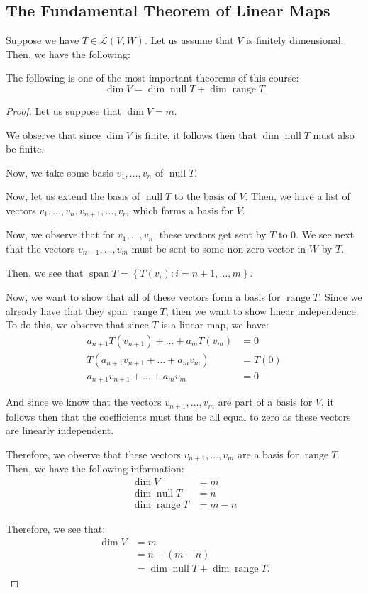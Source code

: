 \documentclass[openany]{book}
\DeclareMathOperator*{\vspan}{span}
\DeclareMathOperator*{\vnull}{null}
\DeclareMathOperator*{\vrange}{range}
\begin{document}
\subsection{The Fundamental Theorem of Linear Maps}
Suppose we have $T \in \mathcal L(V,W)$.  Let us assume that $V$ is finitely dimensional. Then, we have the following:
\begin{thm}
	The following is one of the most important theorems of this course:
	\begin{equation*}
				\dim V = \dim \vnull T + \dim \vrange T 
	\end{equation*}
\end{thm}
\begin{proof}
	Let us suppose that $\dim V = m$.
	
	We observe that since $\dim V$ is finite, it follows then that $\dim \vnull T$ must also be finite.
	
	Now, we take some basis $v_{1}, \ldots, v_{n}$ of $\vnull T$.
	
	Now, let us extend the basis of $\vnull T$ to the basis of $V$. Then, we have a list of vectors $v_{1}, \ldots, v_{n}, v_{n+1}, \ldots, v_{m}$ which forms a basis for $V$.
	
	Now, we observe that for $v_{1}, \ldots, v_{n}$, these vectors get sent by $T$ to $0$. We see next that the vectors $v_{n+1}, \ldots, v_{m}$ must be sent to some non-zero vector in $W$ by $T$.
	
	Then, we see that $\vspan T = \left\{  T(v_{i}) : i = n+1, \ldots, m \right\}$.
	
	Now, we want to show that all of these vectors form a basis for $\vrange T$. Since we already have that they span $\vrange T$, then we want to show linear independence. To do this, we observe that since $T$ is a linear map, we have:
	\begin{align*}
		a_{n+1}T(v_{n+1}) + \ldots + a_{m}T(v_{m}) &= 0 \\
		T(a_{n+1}v_{n+1} + \ldots + a_{m}v_{m}) &= T(0) \\
		a_{n+1}v_{n+1} + \ldots + a_{m}v_{m} &= 0
	\end{align*} 

	And since we know that the vectors $v_{n+1}, \ldots, v_{m}$ are part of a basis for $V$, it follows then that the coefficients must thus be all equal to zero as these vectors are linearly independent.
	
	Therefore, we observe that these vectors $v_{n+1}, \ldots, v_{m}$ are a basis for $\vrange T$. Then, we have the following information:
	\begin{align*}
		\dim V &= m \\
		\dim \vnull T &= n \\
		\dim \vrange T &= m - n
	\end{align*}

	Therefore, we see that:
	\begin{align*}
		\dim V &= m \\
		&= n + (m-n) \\
		&= \dim \vnull T + \dim \vrange T.
	\end{align*}
\end{proof}
\end{document}
